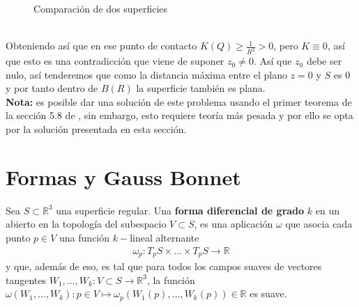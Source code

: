 \documentclass[oneside,11pt]{memoir}
\begin{document}
\begin{figure}[h]
\begin{center}
    \end{center}
    \caption{Comparación de dos superficies}
    \label{fig:problemafinal5}
\end{figure}
\\

Obteniendo así que en ese punto de contacto $K(Q)\geq \frac{1}{R^2}>0$, pero $K\equiv 0$, así que esto es una contradicción que viene de suponer $z_0\neq 0$. Así que $z_0$ debe ser nulo, así tenderemos que como la distancia máxima entre el plano $z=0$ y $S$ es 0 y por tanto dentro de $B(R)$ la superficie también es plana. \\

\textbf{Nota:} es posible dar una solución de este problema usando el primer teorema de la sección 5.8 de \cite{do2016differential}, sin embargo, esto requiere teoría más pesada y por ello se opta por la solución presentada en esta sección.
\section{Formas y Gauss Bonnet}
Sea $S\subset \mathbb{R}^3$ una superficie regular. Una \textbf{forma diferencial de grado }$k$ en un abierto en la topología del subespacio $V\subset S$, es una aplicación $\omega$ que asocia cada punto $p\in V$ una función $k-$lineal alternante 
\begin{align*}
\omega_p:T_pS\times\ldots\times T_pS\to \mathbb{R}
\end{align*}
y que, además de eso, es tal que para todos los campos suaves de vectores tangentes $W_1,\ldots,W_k:V\subset S\to \mathbb{R}^3$, la función $\omega(W_1,\ldots,W_k):p\in V\mapsto \omega_p(W_1(p),\ldots,W_k(p))\in \mathbb{R}$ es suave.\\
\end{document}
